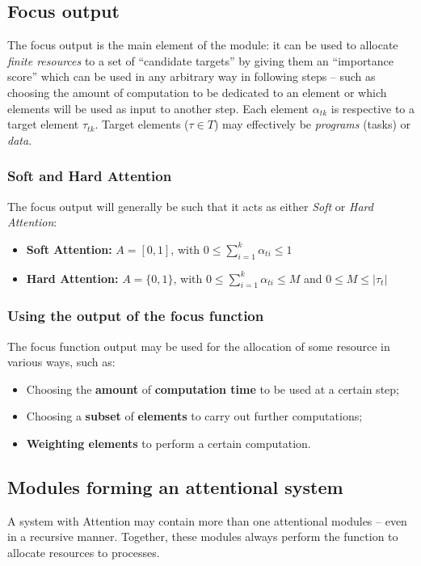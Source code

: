 \documentclass[7pt]{article}
\begin{document}
\subsection{Focus output}
The focus output is the main element of the module: it can be used to allocate \emph{finite resources} to a set of ``candidate targets'' by giving them an ``importance score'' which can be used in any arbitrary way in following steps -- such as choosing the amount of computation to be dedicated to an element or which elements will be used as input to another step.
Each element $\alpha_{tk}$ is respective to a target element $\tau_{tk}$.
Target elements ($\tau \in T$) may effectively be \emph{programs} (tasks) or \emph{data}.

\subsubsection{Soft and Hard Attention}
The focus output will generally be such that it acts as either \emph{Soft} or \emph{Hard Attention}:
\begin{itemize}
    \item \textbf{Soft Attention:}
        $A = [0, 1]$, with $0 \le \sum_{i=1}^{k} \alpha_{ti} \le 1$
    \item \textbf{Hard Attention:}
        $A = \{0, 1\}$, with $0 \le \sum_{i=1}^{k} \alpha_{ti} \le M$ and $0 \le M \le |\tau_t|$
\end{itemize}

\subsubsection{Using the output of the focus function}
The focus function output may be used for the allocation of some resource in various ways, such as:
\begin{itemize}
    \item Choosing the \textbf{amount} of \textbf{computation time} to be used at a certain step;
    \item Choosing a \textbf{subset} of \textbf{elements} to carry out further computations;
    \item \textbf{Weighting elements} to perform a certain computation.
\end{itemize}

\subsection{Modules forming an attentional system}
A system with Attention may contain more than one attentional modules -- even in a recursive manner.
Together, these modules always perform the function to allocate resources to
processes.
\end{document}
